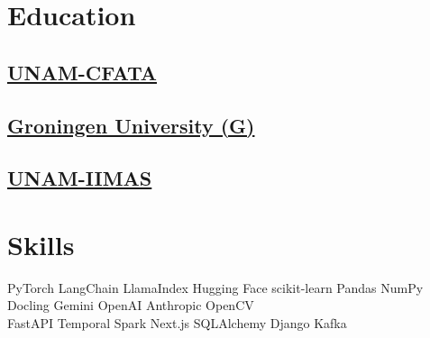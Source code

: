 \documentclass{tex/deedy-resume-openfont}
\begin{document}
\begin{minipage}[t]{0.32\textwidth} 


\section{Education} 

\subsection{\href{http://www.fata.unam.mx/}{UNAM-CFATA}}
\sectionsep

\subsection{\href{https://www.rug.nl/research/bernoulli/}{Groningen University (G)}}
\sectionsep

\subsection{\href{https://www.iimas.unam.mx/}{UNAM-IIMAS}}
\sectionsep


\section{Skills}

PyTorch \textbullet{} 
LangChain \textbullet{} 
LlamaIndex \textbullet{} 
Hugging Face \textbullet{} 
scikit-learn \textbullet{} 
Pandas \textbullet{} 
NumPy \textbullet{} 
Docling \textbullet{} 
Gemini \textbullet{} 
OpenAI \textbullet{} 
Anthropic \textbullet{} 
OpenCV \\[4pt]

FastAPI \textbullet{} 
Temporal \textbullet{} 
Spark \textbullet{} 
Next.js \textbullet{}
SQLAlchemy \textbullet{} 
Django \textbullet{} 
Kafka \\[4pt]


\end{minipage}
\end{document}
